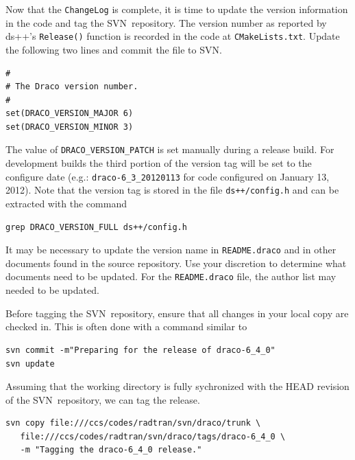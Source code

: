 \documentclass[note]{ResearchNote_pdf}
\newcommand{\svn}{\textsf{SVN}}
\begin{document}
Now that the \texttt{ChangeLog} is complete, it is time to update the
version information in the code and tag the \svn\ repository.  The
version number as reported by \textsf{ds++}'s \texttt{Release()}
function is recorded in the code at \texttt{CMakeLists.txt}.  Update
the following two lines and commit the file to \svn.
%
\begin{lstlisting}[basicstyle=\footnotesize, xleftmargin=2.0in, 
  xrightmargin=2.0in]
#
# The Draco version number.
#
set(DRACO_VERSION_MAJOR 6)
set(DRACO_VERSION_MINOR 3)
\end{lstlisting}
% 
The value of \texttt{DRACO\_VERSION\_PATCH} is set manually during a
release build.  For development builds the third portion of the
version tag will be set to the configure date (e.g.:
\texttt{draco-6\_3\_20120113} for code configured on January 13,
2012).  Note that the version tag is stored in the file
\texttt{ds++/config.h} and can be extracted with the command
\begin{lstlisting}[basicstyle=\footnotesize, xleftmargin=2.0in, 
  xrightmargin=2.0in]
grep DRACO_VERSION_FULL ds++/config.h 
\end{lstlisting}

It may be necessary to update the version name in
\texttt{README.draco} and in other documents found in the source
repository.  Use your discretion to determine what documents need to
be updated.  For the \texttt{README.draco} file, the author list may
needed to be updated.

Before tagging the \svn\ repository, ensure that all changes in your
local copy are checked in.  This is often done with a command similar
to
%
\begin{lstlisting}[basicstyle=\footnotesize, xleftmargin=1.0in, 
  xrightmargin=1.0in]
svn commit -m"Preparing for the release of draco-6_4_0"
svn update 
\end{lstlisting}
%
Assuming that the working directory is fully sychronized with the HEAD
revision of the \svn\ repository, we can tag the release.
%
\begin{lstlisting}[basicstyle=\footnotesize, xleftmargin=1.0in, 
  xrightmargin=1.0in]
svn copy file:///ccs/codes/radtran/svn/draco/trunk \
   file:///ccs/codes/radtran/svn/draco/tags/draco-6_4_0 \
   -m "Tagging the draco-6_4_0 release."
\end{lstlisting}

\end{document}
